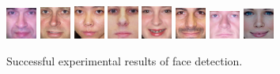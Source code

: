 \begin{figure}[H]
\includegraphics[width=0.09\textwidth]{img/fdResult1/output85.png}
\includegraphics[width=0.09\textwidth]{img/fdResult1/output91.png}
\includegraphics[width=0.09\textwidth]{img/fdResult1/output92.png}
\includegraphics[width=0.09\textwidth]{img/fdResult1/output95.png}
\includegraphics[width=0.09\textwidth]{img/fdResult1/output96.png}
\includegraphics[width=0.09\textwidth]{img/fdResult1/output97.png}
\includegraphics[width=0.09\textwidth]{img/fdResult1/output98.png}
\includegraphics[width=0.09\textwidth]{img/fdResult2/output91.png}

\caption{Successful experimental results of face detection.}
\label{fig:faces}
\end{figure}
